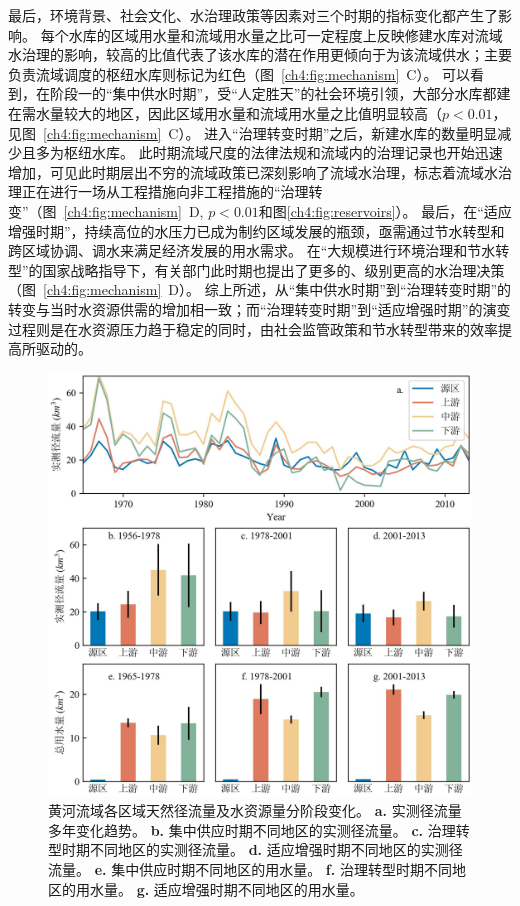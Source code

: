 最后，环境背景、社会文化、水治理政策等因素对三个时期的指标变化都产生了影响。
每个水库的区域用水量和流域用水量之比可一定程度上反映修建水库对流域水治理的影响，较高的比值代表了该水库的潜在作用更倾向于为该流域供水；主要负责流域调度的枢纽水库则标记为红色（图~\ref{ch4:fig:mechanism}~C）。
可以看到，在阶段一的“集中供水时期”，受“人定胜天”的社会环境引领，大部分水库都建在需水量较大的地区，因此区域用水量和流域用水量之比值明显较高（$p<0.01$，见图~\ref{ch4:fig:mechanism}~C）。
进入“治理转变时期”之后，新建水库的数量明显减少且多为枢纽水库。
此时期流域尺度的法律法规和流域内的治理记录也开始迅速增加，可见此时期层出不穷的流域政策已深刻影响了流域水治理，标志着流域水治理正在进行一场从工程措施向非工程措施的“治理转变”（图~\ref{ch4:fig:mechanism}~D, $p<0.01$和图\ref{ch4:fig:reservoirs}）。
最后，在“适应增强时期”，持续高位的水压力已成为制约区域发展的瓶颈，亟需通过节水转型和跨区域协调、调水来满足经济发展的用水需求。
在“大规模进行环境治理和节水转型”的国家战略指导下，有关部门此时期也提出了更多的、级别更高的水治理决策（图~\ref{ch4:fig:mechanism}~D）。
综上所述，从“集中供水时期”到“治理转变时期”的转变与当时水资源供需的增加相一致；而“治理转变时期”到“适应增强时期”的演变过程则是在水资源压力趋于稳定的同时，由社会监管政策和节水转型带来的效率提高所驱动的。

\begin{figure}[htb]
	\centering
	\includegraphics[width=\textwidth]{img/ch4/ch4_natural_water.jpg}
	\caption[黄河流域各区域天然径流量及水资源量分阶段变化]{
        黄河流域各区域天然径流量及水资源量分阶段变化。
        \textbf{a.} 实测径流量多年变化趋势。
        \textbf{b.} 集中供应时期不同地区的实测径流量。
        \textbf{c.} 治理转型时期不同地区的实测径流量。
        \textbf{d.} 适应增强时期不同地区的实测径流量。
        \textbf{e.} 集中供应时期不同地区的用水量。
        \textbf{f.} 治理转型时期不同地区的用水量。
        \textbf{g.} 适应增强时期不同地区的用水量。
    }\label{ch4:fig:natural}
\end{figure}
